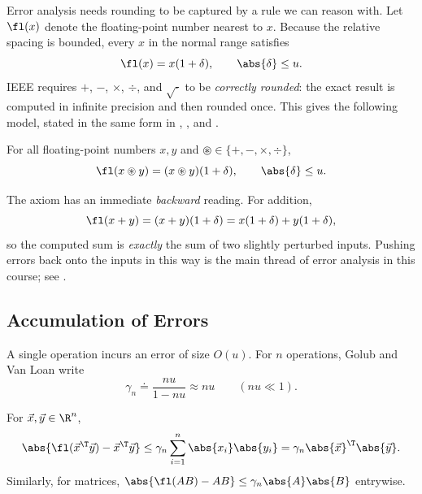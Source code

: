 Error analysis needs rounding to be captured by a rule we can reason with. Let $\fl(x)$ denote the floating-point number nearest to $x$. Because the relative spacing is bounded, every $x$ in the normal range satisfies
\begin{equation}
  \fl(x) = x(1 + \delta), \qquad \abs{\delta} \le u. \label{eq:fl}
\end{equation}
IEEE requires $+$, $-$, $\times$, $\div$, and $\sqrt{\cdot}$ to be \emph{correctly rounded}: the exact result is computed in infinite precision and then rounded once. This gives the following model, stated in the same form in \cite[Lecture 13]{TB}, \cite[\S2.4]{GVL}, and \cite[\S1.5]{Demmel}.

\begin{theorem}
  \label{thm:axiom}
  For all floating-point numbers $x, y$ and $\circledast \in \{+, -, \times, \div\}$,
  \begin{equation}
    \fl(x \circledast y) = (x \circledast y)(1 + \delta), \qquad \abs{\delta} \le u.
  \end{equation}
\end{theorem}

The axiom has an immediate \emph{backward} reading. For addition,
\begin{equation}
  \fl(x + y) = (x + y)(1 + \delta) = x(1 + \delta) + y(1 + \delta),
\end{equation}
so the computed sum is \emph{exactly} the sum of two slightly perturbed inputs. Pushing errors back onto the inputs in this way is the main thread of error analysis in this course; see .

\subsection{Accumulation of Errors}

A single operation incurs an error of size $O(u)$. For $n$ operations, Golub and Van Loan write
\begin{equation}
  \gamma_n \doteq \frac{nu}{1 - nu} \approx nu \qquad (nu \ll 1).
\end{equation}

\begin{proposition}
  \label{prop:dot}
  For $\vec{x}, \vec{y} \in \R^n$,
  \begin{equation}
    \abs{\fl(\vec{x}^\T \vec{y}) - \vec{x}^\T \vec{y}} \le \gamma_n \sum_{i=1}^{n} \abs{x_i}\abs{y_i} = \gamma_n \abs{\vec{x}}^\T \abs{\vec{y}}.
  \end{equation}
  Similarly, for matrices, $\abs{\fl(AB) - AB} \le \gamma_n \abs{A}\abs{B}$ entrywise.
\end{proposition}

